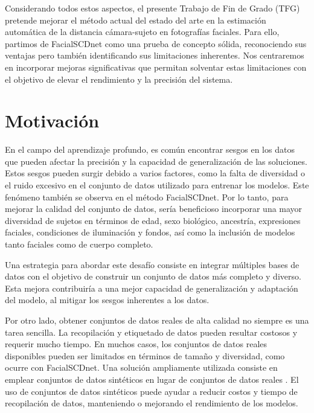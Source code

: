 
Considerando todos estos aspectos, el presente Trabajo de Fin de Grado (TFG) pretende mejorar el método actual del estado del arte en la estimación automática de la distancia cámara-sujeto en fotografías faciales. Para ello, partimos de FacialSCDnet como una prueba de concepto sólida, reconociendo sus ventajas pero también identificando sus limitaciones inherentes. Nos centraremos en incorporar mejoras significativas que permitan solventar estas limitaciones con el objetivo de elevar el rendimiento y la precisión del sistema.

\section{Motivación}

En el campo del aprendizaje profundo, es común encontrar sesgos en los datos que pueden afectar la precisión y la capacidad de generalización de las soluciones. Estos sesgos pueden surgir debido a varios factores, como la falta de diversidad o el ruido excesivo en el conjunto de datos utilizado para entrenar los modelos. Este fenómeno también se observa en el método FacialSCDnet.
Por lo tanto, para mejorar la calidad del conjunto de datos, sería beneficioso incorporar una mayor diversidad de sujetos en términos de edad, sexo biológico, ancestría, expresiones faciales, condiciones de iluminación y fondos, así como la inclusión de modelos tanto faciales como de cuerpo completo. 

Una estrategia para abordar este desafío consiste en integrar múltiples bases de datos con el objetivo de construir un conjunto de datos más completo y diverso. Esta mejora contribuiría a una mejor capacidad de generalización y adaptación del modelo, al mitigar los sesgos inherentes a los datos.


Por otro lado, obtener conjuntos de datos reales de alta calidad no siempre es una tarea sencilla. La recopilación y etiquetado de datos pueden resultar costosos y requerir mucho tiempo. En muchos casos, los conjuntos de datos reales disponibles pueden ser limitados en términos de tamaño y diversidad, como ocurre con FacialSCDnet.
Una solución ampliamente utilizada consiste en emplear conjuntos de datos sintéticos en lugar de conjuntos de datos reales \cite{57,58,59}.
El uso de conjuntos de datos sintéticos puede ayudar a reducir costos y tiempo de recopilación de datos, manteniendo o mejorando el rendimiento de los modelos.

